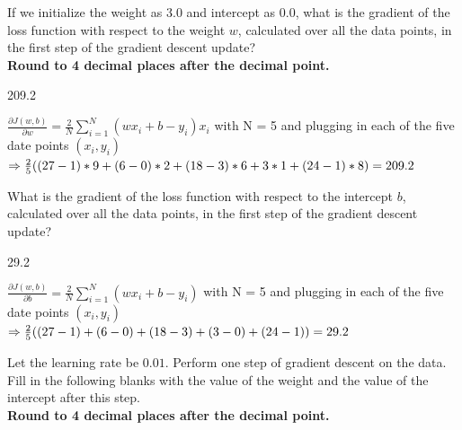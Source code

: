 \documentclass[11pt,addpoints,answers]{exam}
\begin{document}
\begin{questions}
\begin{parts}
\begin{subparts}
         \subpart[2]  If we initialize the weight as $3.0$ and intercept as $0.0$, what is the gradient of the loss function with respect to the weight $w$, calculated over all the data points, in the first step of the gradient descent update? 
        \\ \textbf{Round to 4 decimal places after the decimal point.}
        
        \begin{your_solution}[title=Gradient:,height=2cm,width=6cm]
        	209.2
        \end{your_solution}

        \begin{your_solution}[title=Work,height=6cm]
        $\frac{\partial J(w, b)}{\partial w} = \frac{2}{N} \sum_{i=1}^{N} (w x_i + b - y_i) x_i$
        \small
        \newline with N = 5 and plugging in each of the five date points $(x_i, y_i)$
        \newline
        $\Rightarrow \frac{2}{5} ((27-1)*9 + (6-0)*2 + (18-3)*6 + 3*1 + (24-1)*8) \newline= 209.2$
        \end{your_solution}
    \clearpage


    \subpart[2] What is the gradient of the loss function with respect to the intercept $b$, calculated over all the data points, in the first step of the gradient descent update?

        \begin{your_solution}[title=Gradient:,height=2cm,width=6cm]
        	29.2
        \end{your_solution}

        \begin{your_solution}[title=Work,height=8cm]
        $\frac{\partial J(w, b)}{\partial b} = \frac{2}{N} \sum_{i=1}^{N} (w x_i + b - y_i)$
		\small
		\newline with N = 5 and plugging in each of the five date points $(x_i, y_i)$
		\newline
		$\Rightarrow \frac{2}{5} ((27-1) + (6-0) + (18-3) + (3-0) + (24-1)) \newline= 29.2$        
        \end{your_solution}


    
    
    
    \subpart[2]  Let the learning rate be $0.01$. Perform one step of gradient descent on the data. Fill in the following blanks with the value of the weight and the value of the intercept after this step. 
        \\ \textbf{Round to 4 decimal places after the decimal point.}
    

\end{subparts}
\end{parts}
\end{questions}
\end{document}
